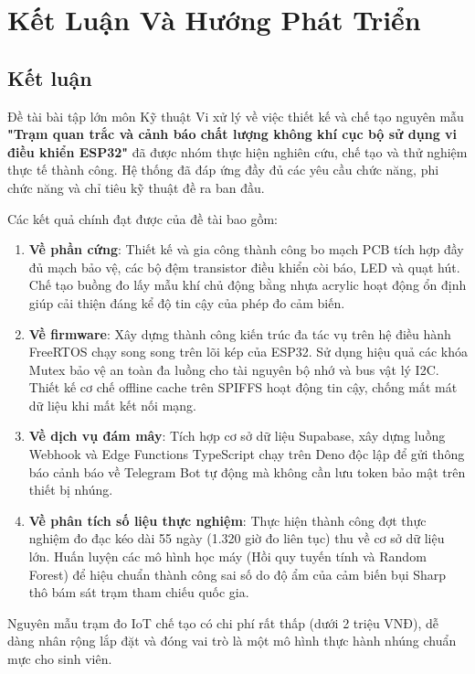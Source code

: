 \chapter{Kết Luận Và Hướng Phát Triển}

\section{Kết luận}
Đề tài bài tập lớn môn Kỹ thuật Vi xử lý về việc thiết kế và chế tạo nguyên mẫu \textbf{"Trạm quan trắc và cảnh báo chất lượng không khí cục bộ sử dụng vi điều khiển ESP32"} đã được nhóm thực hiện nghiên cứu, chế tạo và thử nghiệm thực tế thành công. Hệ thống đã đáp ứng đầy đủ các yêu cầu chức năng, phi chức năng và chỉ tiêu kỹ thuật đề ra ban đầu.

Các kết quả chính đạt được của đề tài bao gồm:
\begin{enumerate}
    \item \textbf{Về phần cứng}: Thiết kế và gia công thành công bo mạch PCB tích hợp đầy đủ mạch bảo vệ, các bộ đệm transistor điều khiển còi báo, LED và quạt hút. Chế tạo buồng đo lấy mẫu khí chủ động bằng nhựa acrylic hoạt động ổn định giúp cải thiện đáng kể độ tin cậy của phép đo cảm biến.
    \item \textbf{Về firmware}: Xây dựng thành công kiến trúc đa tác vụ trên hệ điều hành FreeRTOS chạy song song trên lõi kép của ESP32. Sử dụng hiệu quả các khóa Mutex bảo vệ an toàn đa luồng cho tài nguyên bộ nhớ và bus vật lý I2C. Thiết kế cơ chế offline cache trên SPIFFS hoạt động tin cậy, chống mất mát dữ liệu khi mất kết nối mạng.
    \item \textbf{Về dịch vụ đám mây}: Tích hợp cơ sở dữ liệu Supabase, xây dựng luồng Webhook và Edge Functions TypeScript chạy trên Deno độc lập để gửi thông báo cảnh báo về Telegram Bot tự động mà không cần lưu token bảo mật trên thiết bị nhúng.
    \item \textbf{Về phân tích số liệu thực nghiệm}: Thực hiện thành công đợt thực nghiệm đo đạc kéo dài 55 ngày (1.320 giờ đo liên tục) thu về cơ sở dữ liệu lớn. Huấn luyện các mô hình học máy (Hồi quy tuyến tính và Random Forest) để hiệu chuẩn thành công sai số do độ ẩm của cảm biến bụi Sharp thô bám sát trạm tham chiếu quốc gia.
\end{enumerate}

Nguyên mẫu trạm đo IoT chế tạo có chi phí rất thấp (dưới 2 triệu VNĐ), dễ dàng nhân rộng lắp đặt và đóng vai trò là một mô hình thực hành nhúng chuẩn mực cho sinh viên.

